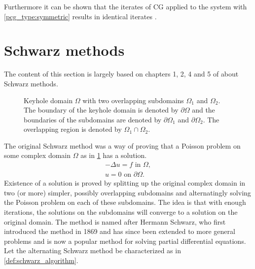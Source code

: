 Furthermore it can be shown that the iterates of CG applied to the system with \ref{pcg_type:symmetric} results in identical iterates \cite[Algorithm 9.2]{iter_method_saad}.

\section{Schwarz methods}\label{sec:schwarz_methods}
The content of this section is largely based on chapters 1, 2, 4 and 5 of \cite{schwarz_methods_Dolean_2015} about Schwarz methods.
\begin{figure}[H]
  \centering
  
  \caption{Keyhole domain $\Omega$ with two overlapping subdomains $\Omega_1$ and $\Omega_2$. The boundary of the keyhole domain is denoted by $\partial\Omega$ and the boundaries of the subdomains are denoted by $\partial\Omega_1$ and $\partial\Omega_2$. The overlapping region is denoted by $\Omega_1 \cap \Omega_2$.}
  \label{fig:keyhole_domain}
\end{figure}
The original Schwarz method was a way of proving that a Poisson problem on some complex domain $\Omega$ as in \cref{fig:keyhole_domain} has a solution.
\begin{equation}
    \begin{array}{c}
        -\Delta u = f \text{ in } \Omega, \\
        u = 0 \text{ on } \partial \Omega.
    \end{array}
    \label{eq:poisson_problem}
\end{equation}
Existence of a solution is proved by splitting up the original complex domain in two (or more) simpler, possibly overlapping subdomains and alternatingly solving the Poisson problem on each of these subdomains. The idea is that with enough iterations, the solutions on the subdomains will converge to a solution on the original domain. The method is named after Hermann Schwarz, who first introduced the method in 1869 \cite{og_schwarz_method_Schwarz} and has since been extended to more general problems and is now a popular method for solving partial differential equations. Let the alternating Schwarz method be characterized as in \cref{def:schwarz_algorithm}.
